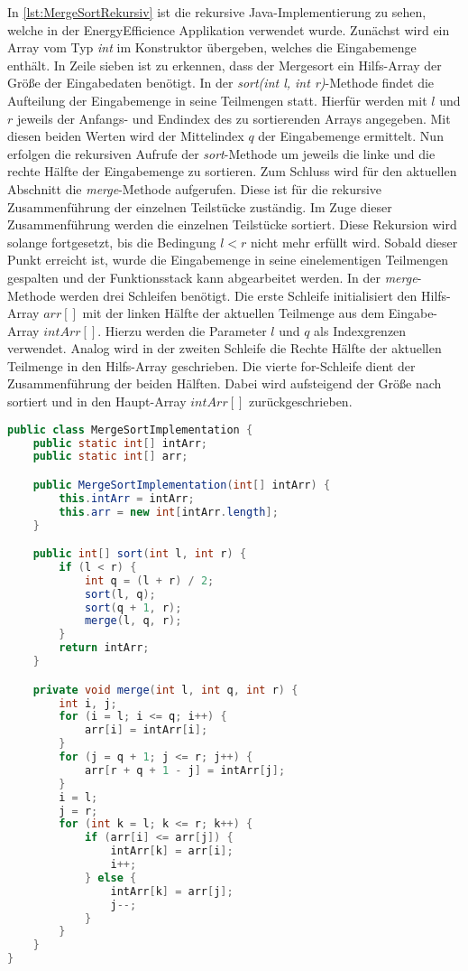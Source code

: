 In \autoref{lst:MergeSortRekursiv} ist die rekursive Java-Implementierung zu sehen, welche in der \glqq EnergyEfficience\grqq{} Applikation verwendet wurde. Zunächst wird ein Array vom Typ \emph{int} im Konstruktor übergeben, welches die Eingabemenge enthält. In Zeile sieben ist zu erkennen, dass der Mergesort ein Hilfs-Array der Größe der Eingabedaten benötigt. In der \emph{sort(int l, int r)}-Methode findet die Aufteilung der Eingabemenge in seine Teilmengen statt. Hierfür werden mit $l$ und $r$ jeweils der Anfangs- und Endindex des zu sortierenden Arrays angegeben. Mit diesen beiden Werten wird der Mittelindex $q$ der Eingabemenge ermittelt. Nun erfolgen die rekursiven Aufrufe der \emph{sort}-Methode um jeweils die linke und die rechte Hälfte der Eingabemenge zu sortieren. Zum Schluss wird für den aktuellen Abschnitt die \emph{merge}-Methode aufgerufen. Diese ist für die rekursive Zusammenführung der einzelnen Teilstücke zuständig. Im Zuge dieser Zusammenführung werden die einzelnen Teilstücke sortiert. Diese Rekursion wird solange fortgesetzt, bis die Bedingung $l < r$ nicht mehr erfüllt wird. Sobald dieser Punkt erreicht ist, wurde die Eingabemenge in seine einelementigen Teilmengen gespalten und der Funktionsstack kann abgearbeitet werden. In der \emph{merge}-Methode werden drei Schleifen benötigt. Die erste Schleife initialisiert den Hilfs-Array $arr[]$ mit der linken Hälfte der aktuellen Teilmenge aus dem Eingabe-Array $intArr[]$. Hierzu werden die Parameter $l$ und $q$ als Indexgrenzen verwendet. Analog wird in der zweiten Schleife die Rechte Hälfte der aktuellen Teilmenge in den Hilfs-Array geschrieben. Die vierte for-Schleife dient der Zusammenführung der beiden Hälften. Dabei wird aufsteigend der Größe nach sortiert und in den Haupt-Array $intArr[]$ zurückgeschrieben.

\begin{lstlisting}[language=java,caption={rekursiver Merge sort (Quelle: \cite{MergeSortRekursiv})},label=lst:MergeSortRekursiv]
public class MergeSortImplementation {
    public static int[] intArr;
    public static int[] arr;

    public MergeSortImplementation(int[] intArr) {
        this.intArr = intArr;
        this.arr = new int[intArr.length];
    }

    public int[] sort(int l, int r) {
        if (l < r) {
            int q = (l + r) / 2;
            sort(l, q);
            sort(q + 1, r);
            merge(l, q, r);
        }
        return intArr;
    }

    private void merge(int l, int q, int r) {
        int i, j;
        for (i = l; i <= q; i++) {
            arr[i] = intArr[i];
        }
        for (j = q + 1; j <= r; j++) {
            arr[r + q + 1 - j] = intArr[j];
        }
        i = l;
        j = r;
        for (int k = l; k <= r; k++) {
            if (arr[i] <= arr[j]) {
                intArr[k] = arr[i];
                i++;
            } else {
                intArr[k] = arr[j];
                j--;
            }
        }
    }
}
\end{lstlisting}

